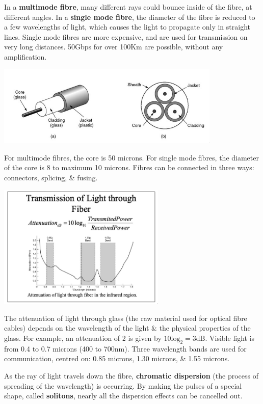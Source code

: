 \documentclass[11pt]{article}
\begin{document}
In a \textbf{multimode fibre}, many different rays could bounce inside of the fibre, at different angles. 
In a \textbf{single mode fibre}, the diameter of the fibre is reduced to a few wavelengths of light, which causes the 
light to propagate only in straight lines. 
Single mode fibres are more expensive, and are used for transmission on very long distances. 
50Gbps for over 100Km are possible, without any amplification. 

\begin{center}
    \includegraphics[width=0.8\textwidth]{p31.png}
\end{center}

For multimode fibres, the core is 50 microns. For single mode fibres, the diameter of the core is 8 to maximum 10 microns. 
Fibres can be connected in three ways: connectors, splicing, \& fusing.

\begin{center}
    \includegraphics[width=0.6\textwidth]{translightfibre.png}
\end{center}

The attenuation of light through glass (the raw material used for optical fibre cables) depends on the wavelength of the 
light \& the physical properties of the glass. 
For example, an attenuation of 2 is given by $10 \text{log}_2 = 3\text{dB}$. 
Visible light is from 0.4 to 0.7 microns (400 to 700nm). 
Three wavelength bands are used for communication, centred on: 0.85 microns, 1.30 microns, \& 1.55 microns. 

As the ray of light travels down the fibre, \textbf{chromatic dispersion} (the process of spreading of the wavelength) is 
occurring. 
By making the pulses of a special shape, called \textbf{solitons}, nearly all the dispersion effects can be cancelled out. 
\end{document}
